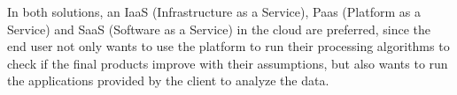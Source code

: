 In both solutions, an IaaS (Infrastructure as a Service), Paas (Platform as a Service) and SaaS (Software as a Service) in the cloud are preferred, since the end user not only wants to use the platform to run their processing algorithms to check if the final products improve with their assumptions, but also wants to run the applications provided by the client to analyze the data.


